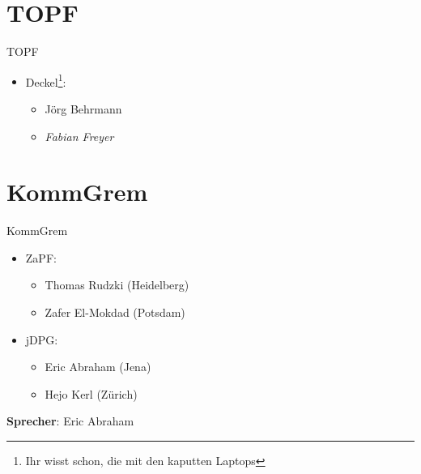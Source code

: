 \documentclass[compress,]{beamer}
\begin{document}
\section{TOPF}

\begin{frame}{TOPF}
	\begin{itemize}
		\item[] Deckel\footnote{Ihr wisst schon, die mit den kaputten Laptops}:
			\begin{itemize}
				\item Jörg Behrmann
				\item \emph{Fabian Freyer}
			\end{itemize}
	\end{itemize}
\end{frame}

\section{KommGrem}

\begin{frame}{KommGrem}
	\begin{itemize}
		\item[] ZaPF:
			\begin{itemize}
				\item Thomas Rudzki (Heidelberg)
				\item Zafer El-Mokdad (Potsdam)
			\end{itemize}
		\item[] jDPG:
			\begin{itemize}
				\item Eric Abraham (Jena)
				\item Hejo Kerl (Zürich)
			\end{itemize}
	\end{itemize}
	\vspace{0.5cm}
	\textbf{Sprecher}: Eric Abraham
\end{frame}
\end{document}
